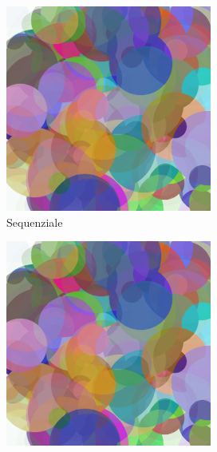 \documentclass[11pt]{article}
\begin{document}
    \begin{figure}[h!]
        \begin{subfigure}{0.32\textwidth}
            \centering
            \includegraphics[width=\textwidth]{img/seq/10000}
            \caption{Sequenziale}
        \end{subfigure}%
        \hfill
        \begin{subfigure}{0.32\textwidth}
            \centering
            \includegraphics[width=\textwidth]{img/par/10000}

\end{subfigure}
\end{figure}
\end{document}
